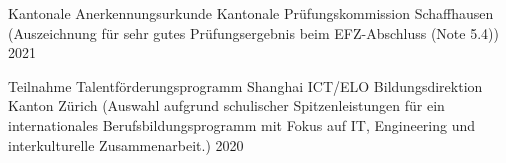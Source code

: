 

\begin{cvhonors}
  \cvhonor
    {Kantonale Anerkennungsurkunde} %
    {Kantonale Prüfungskommission Schaffhausen (Auszeichnung für sehr gutes Prüfungsergebnis beim EFZ-Abschluss (Note 5.4))} %
    {} %
    {2021} %

  \cvhonor
    {Teilnahme Talentförderungsprogramm Shanghai ICT/ELO} %
    {Bildungsdirektion Kanton Zürich (Auswahl aufgrund schulischer Spitzenleistungen für ein internationales Berufsbildungsprogramm mit Fokus auf IT, Engineering und interkulturelle Zusammenarbeit.)} %
    {} %
    {2020} %
\end{cvhonors}

